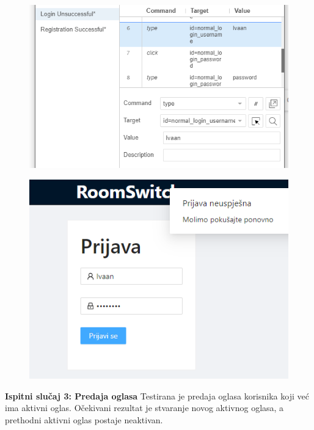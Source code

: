 			\begin{figure}[H]
				\includegraphics[scale=0.6]{slike/test9.PNG} %
				\centering
				\label{fig:test9}
			\end{figure}
			\begin{figure}[H]
				\includegraphics[scale=0.6]{slike/test9pom.PNG} %
				\centering
				\label{fig:test9pom}
			\end{figure}
			
			\textbf{Ispitni slučaj 3: Predaja oglasa}
			Testirana je predaja oglasa korisnika koji već ima aktivni oglas. Očekivani rezultat je stvaranje novog aktivnog oglasa, a prethodni aktivni oglas postaje neaktivan.	
			
